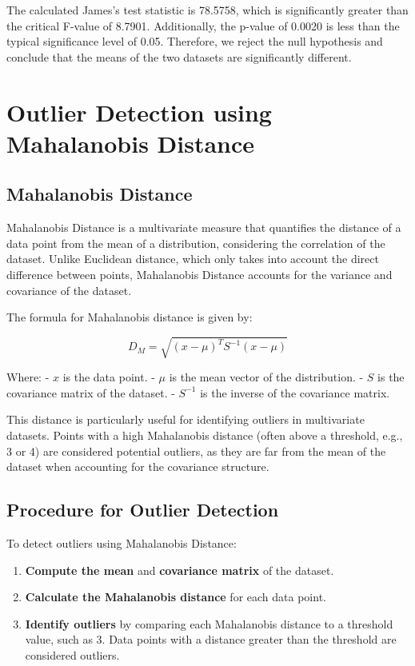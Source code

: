 \documentclass[11pt]{article}
\begin{document}
The calculated James's test statistic is 78.5758, which is significantly greater than the critical F-value of 8.7901. Additionally, the p-value of 0.0020 is less than the typical significance level of 0.05. Therefore, we reject the null hypothesis and conclude that the means of the two datasets are significantly different.

\section{Outlier Detection using Mahalanobis Distance}

\subsection{Mahalanobis Distance}

Mahalanobis Distance is a multivariate measure that quantifies the distance of a data point from the mean of a distribution, considering the correlation of the dataset. Unlike Euclidean distance, which only takes into account the direct difference between points, Mahalanobis Distance accounts for the variance and covariance of the dataset.

The formula for Mahalanobis distance is given by:

\[
D_M = \sqrt{(x - \mu)^T S^{-1} (x - \mu)}
\]

Where:
- \( x \) is the data point.
- \( \mu \) is the mean vector of the distribution.
- \( S \) is the covariance matrix of the dataset.
- \( S^{-1} \) is the inverse of the covariance matrix.

This distance is particularly useful for identifying outliers in multivariate datasets. Points with a high Mahalanobis distance (often above a threshold, e.g., 3 or 4) are considered potential outliers, as they are far from the mean of the dataset when accounting for the covariance structure.

\subsection{Procedure for Outlier Detection}

To detect outliers using Mahalanobis Distance:
\begin{enumerate}
    \item \textbf{Compute the mean} and \textbf{covariance matrix} of the dataset.
    \item \textbf{Calculate the Mahalanobis distance} for each data point.
    \item \textbf{Identify outliers} by comparing each Mahalanobis distance to a threshold value, such as 3. Data points with a distance greater than the threshold are considered outliers.
\end{enumerate}
\end{document}
